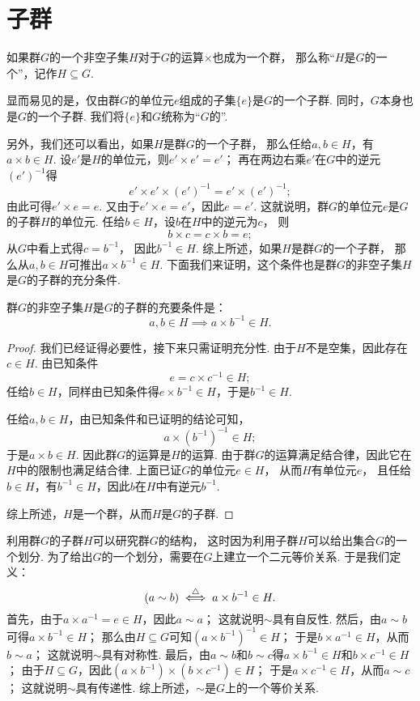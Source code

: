 \section{子群}
\begin{definition}
如果群\(G\)的一个非空子集\(H\)对于\(G\)的运算\(\times\)也成为一个群，
那么称“\(H\)是\(G\)的一个”，记作\(H \subseteq G\).
\end{definition}

显而易见的是，仅由群\(G\)的单位元\(e\)组成的子集\(\{e\}\)是\(G\)的一个子群.
同时，\(G\)本身也是\(G\)的一个子群.
我们将\(\{e\}\)和\(G\)统称为“\(G\)的”.

另外，我们还可以看出，如果\(H\)是群\(G\)的一个子群，
那么任给\(a,b \in H\)，有\(a \times b \in H\).
设\(e'\)是\(H\)的单位元，则\(e' \times e' = e'\)；
再在两边右乘\(e'\)在\(G\)中的逆元\((e')^{-1}\)得\[
	e' \times e' \times (e')^{-1} = e' \times (e')^{-1};
\]
由此可得\(e' \times e = e\).
又由于\(e' \times e = e'\)，因此\(e = e'\).
这就说明，群\(G\)的单位元\(e\)是\(G\)的子群\(H\)的单位元.
任给\(b \in H\)，设\(b\)在\(H\)中的逆元为\(c\)，
则\[
	b \times c = c \times b = e;
\]
从\(G\)中看上式得\(c = b^{-1}\)，
因此\(b^{-1} \in H\).
综上所述，如果\(H\)是群\(G\)的一个子群，
那么从\(a,b \in H\)可推出\(a \times b^{-1} \in H\).
下面我们来证明，这个条件也是群\(G\)的非空子集\(H\)是\(G\)的子群的充分条件.
\begin{theorem}
群\(G\)的非空子集\(H\)是\(G\)的子群的充要条件是：\[
	a,b \in H \implies a \times b^{-1} \in H.
\]
\begin{proof}
我们已经证得必要性，接下来只需证明充分性.
由于\(H\)不是空集，因此存在\(c \in H\).
由已知条件\[
	e = c \times c^{-1} \in H;
\]
任给\(b \in H\)，同样由已知条件得\(e \times b^{-1} \in H\)，于是\(b^{-1} \in H\).

任给\(a,b \in H\)，由已知条件和已证明的结论可知，\[
	a \times (b^{-1})^{-1} \in H;
\]于是\(a \times b \in H\).
因此群\(G\)的运算是\(H\)的运算.
由于群\(G\)的运算满足结合律，因此它在\(H\)中的限制也满足结合律.
上面已证\(G\)的单位元\(e \in H\)，
从而\(H\)有单位元\(e\)，
且任给\(b \in H\)，有\(b^{-1} \in H\)，因此\(b\)在\(H\)中有逆元\(b^{-1}\).

综上所述，\(H\)是一个群，从而\(H\)是\(G\)的子群.
\end{proof}
\end{theorem}

利用群\(G\)的子群\(H\)可以研究群\(G\)的结构，
这时因为利用子群\(H\)可以给出集合\(G\)的一个划分.
为了给出\(G\)的一个划分，需要在\(G\)上建立一个二元等价关系.
于是我们定义：\[
	(a \sim b)
	\overset{\triangle}{\iff}
	a \times b^{-1} \in H.
\]
首先，由于\(a \times a^{-1} = e \in H\)，因此\(a \sim a\)；
这就说明\(\sim\)具有自反性.
然后，由\(a \sim b\)可得\(a \times b^{-1} \in H\)；
那么由\(H \subseteq G\)可知\((a \times b^{-1})^{-1} \in H\)；
于是\(b \times a^{-1} \in H\)，从而\(b \sim a\)；
这就说明\(\sim\)具有对称性.
最后，由\(a \sim b\)和\(b \sim c\)得\(a \times b^{-1} \in H\)和\(b \times c^{-1} \in H\)；
由于\(H \subseteq G\)，因此\((a \times b^{-1}) \times (b \times c^{-1}) \in H\)；
于是\(a \times c^{-1} \in H\)，从而\(a \sim c\)；
这就说明\(\sim\)具有传递性.
综上所述，\(\sim\)是\(G\)上的一个等价关系.

